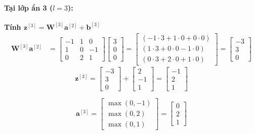 \paragraph{Tại lớp ẩn 3 ($l=3$):\\}
\textbf{Tính $\mathbf{z}^{[3]} = \mathbf{W}^{[3]}\mathbf{a}^{[2]} + \mathbf{b}^{[3]}$}
\begin{align*}
\mathbf{W}^{[3]}\mathbf{a}^{[2]} 
&= 
\begin{bmatrix}
    -1 & 1 & 0 \\
    1 & 0 & -1 \\
    0 & 2 & 1
\end{bmatrix}
\begin{bmatrix}
    3 \\ 0 \\ 0
\end{bmatrix}
=
\begin{bmatrix}
    (-1\cdot 3 + 1\cdot 0 + 0\cdot 0) \\
    (1\cdot 3 + 0\cdot 0 - 1\cdot 0) \\
    (0\cdot 3 + 2\cdot 0 + 1\cdot 0)
\end{bmatrix}
=
\begin{bmatrix}
    -3 \\ 3 \\ 0
\end{bmatrix}
\end{align*}
\begin{equation}
\mathbf{z}^{[3]} = 
\begin{bmatrix}
    -3 \\ 3 \\ 0
\end{bmatrix}
+
\begin{bmatrix}
    2 \\ -1 \\ 1
\end{bmatrix}
=
\begin{bmatrix}
    -1 \\ 2 \\ 1
\end{bmatrix}
\end{equation}

\begin{equation}
\mathbf{a}^{[3]} = 
\begin{bmatrix}
    \max(0, -1) \\
    \max(0, 2) \\
    \max(0, 1)
\end{bmatrix}
=
\begin{bmatrix}
    0 \\ 2 \\ 1
\end{bmatrix}
\end{equation}

